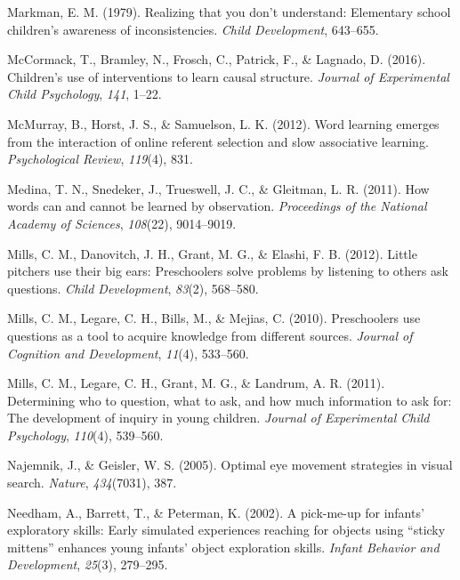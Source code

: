 \documentclass[oneside]{report}
\begin{document}
\hypertarget{ref-markman1979realizing}{}
Markman, E. M. (1979). Realizing that you don't understand: Elementary
school children's awareness of inconsistencies. \emph{Child
Development}, 643--655.

\hypertarget{ref-mccormack2016children}{}
McCormack, T., Bramley, N., Frosch, C., Patrick, F., \& Lagnado, D.
(2016). Children's use of interventions to learn causal structure.
\emph{Journal of Experimental Child Psychology}, \emph{141}, 1--22.

\hypertarget{ref-mcmurray2012word}{}
McMurray, B., Horst, J. S., \& Samuelson, L. K. (2012). Word learning
emerges from the interaction of online referent selection and slow
associative learning. \emph{Psychological Review}, \emph{119}(4), 831.

\hypertarget{ref-medina2011words}{}
Medina, T. N., Snedeker, J., Trueswell, J. C., \& Gleitman, L. R.
(2011). How words can and cannot be learned by observation.
\emph{Proceedings of the National Academy of Sciences}, \emph{108}(22),
9014--9019.

\hypertarget{ref-mills2012little}{}
Mills, C. M., Danovitch, J. H., Grant, M. G., \& Elashi, F. B. (2012).
Little pitchers use their big ears: Preschoolers solve problems by
listening to others ask questions. \emph{Child Development},
\emph{83}(2), 568--580.

\hypertarget{ref-mills2010preschoolers}{}
Mills, C. M., Legare, C. H., Bills, M., \& Mejias, C. (2010).
Preschoolers use questions as a tool to acquire knowledge from different
sources. \emph{Journal of Cognition and Development}, \emph{11}(4),
533--560.

\hypertarget{ref-mills2011determining}{}
Mills, C. M., Legare, C. H., Grant, M. G., \& Landrum, A. R. (2011).
Determining who to question, what to ask, and how much information to
ask for: The development of inquiry in young children. \emph{Journal of
Experimental Child Psychology}, \emph{110}(4), 539--560.

\hypertarget{ref-najemnik2005optimal}{}
Najemnik, J., \& Geisler, W. S. (2005). Optimal eye movement strategies
in visual search. \emph{Nature}, \emph{434}(7031), 387.

\hypertarget{ref-needham2002pick}{}
Needham, A., Barrett, T., \& Peterman, K. (2002). A pick-me-up for
infants' exploratory skills: Early simulated experiences reaching for
objects using ``sticky mittens'' enhances young infants' object
exploration skills. \emph{Infant Behavior and Development},
\emph{25}(3), 279--295.
\end{document}

